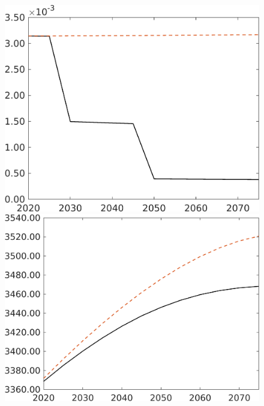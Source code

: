 \begin{figure}[h!!]
\begin{minipage}[]{0.32\textwidth}
	\includegraphics[width=1\textwidth]{../../codding_model/own_basedOnFried/optimalPol_190722_tidiedUp/figures/all_July22/Lf_TargetCompSP_T_spillover0_noskill0_sep1_xgrowth0_etaa0.79_lgd0.png}
\end{minipage}

\begin{minipage}[]{0.32\textwidth}
	\includegraphics[width=1\textwidth]{../../codding_model/own_basedOnFried/optimalPol_190722_tidiedUp/figures/all_July22/Af_TargetCompSP_T_spillover0_noskill0_sep1_xgrowth0_etaa0.79_lgd0.png}
\end{minipage}
\end{figure}

